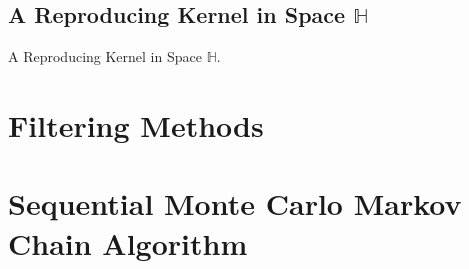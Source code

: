 \subsection{A Reproducing Kernel in Space $\mathbb{H}$}\label{sectionRK}

A Reproducing Kernel in Space $\mathbb{H}$.


\section{Filtering Methods}

\section{Sequential Monte Carlo Markov Chain Algorithm}



